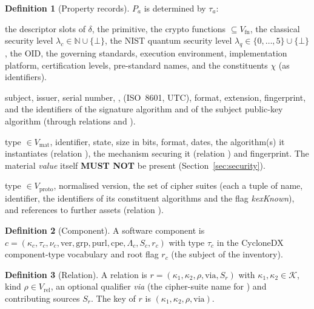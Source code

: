 \documentclass[11pt,a4paper]{article}
\newcommand{\MUSTNOT}{\textbf{MUST NOT}}
\newcommand{\Ids}{\mathcal{K}}
\theoremstyle{definition}
\newtheorem{definition}{Definition}[section]
\theoremstyle{plain}
\begin{document}
\begin{definition}[Property records]\label{def:props}
$P_a$ is determined by $\tau_a$:
\begin{description}[nosep,leftmargin=1.5em]
\item[algorithm] the descriptor slots of $\delta$, the primitive, the crypto functions
  $\subseteq V_{\mathrm{fn}}$, the classical security level $\lambda_c \in \mathbb{N}\cup\{\bot\}$,
  the NIST quantum security level $\lambda_q \in \{0,\dots,5\}\cup\{\bot\}$, the OID, the governing
  standards, execution environment, implementation platform, certification levels, pre-standard
  names, and the constituents $\chi$ (as identifiers).
\item[certificate] subject, issuer, serial number, ,  (ISO~8601,
  UTC), format, extension, fingerprint, and the identifiers of the signature algorithm and of the
  subject public-key algorithm (through relations  and ).
\item[related-crypto-material] type $\in V_{\mathrm{mat}}$, identifier, state, size in bits,
  format, dates, the algorithm(s) it instantiates (relation ), the mechanism
  securing it (relation ) and fingerprint. The material \emph{value} itself
  \MUSTNOT{} be present (Section~\ref{sec:security}).
\item[protocol] type $\in V_{\mathrm{proto}}$, normalised version, the set of cipher suites
  (each a tuple of name, identifier, the identifiers of its constituent algorithms and the
  flag \emph{kexKnown}), and references to further assets (relation ).
\end{description}
\end{definition}

\begin{definition}[Component]
A software component is $c = (\kappa_c, \tau_c, \nu_c, \mathrm{ver}, \mathrm{grp}, \mathrm{purl},
\mathrm{cpe}, \Lambda_c, S_c, r_c)$ with type $\tau_c$ in the CycloneDX component-type
vocabulary and root flag $r_c$ (the subject of the inventory).
\end{definition}

\begin{definition}[Relation]
A relation is $r = (\kappa_1, \kappa_2, \rho, \text{via}, S_r)$ with $\kappa_1,\kappa_2 \in \Ids$,
kind $\rho \in V_{\mathrm{rel}}$, an optional qualifier \emph{via} (the cipher-suite name for
) and contributing sources $S_r$. The key of $r$ is $(\kappa_1,\kappa_2,\rho,\text{via})$.
\end{definition}
\end{document}
